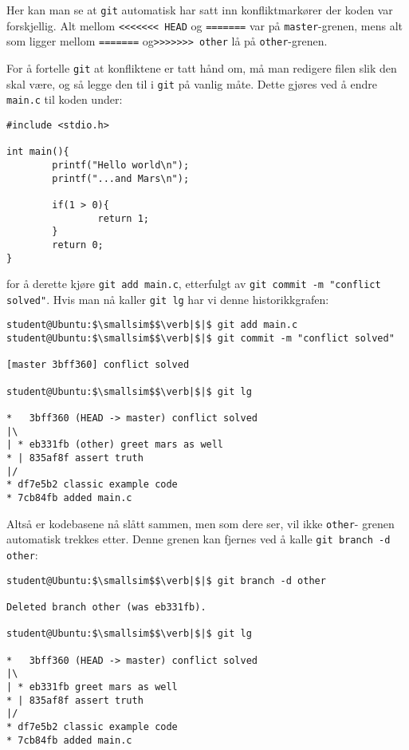 \begin{alphasection}
Her kan man se at \verb|git| automatisk har satt inn konfliktmarkører der koden var forskjellig. Alt mellom \verb|<<<<<<< HEAD| og \verb|=======| var på \verb|master|-grenen, mens alt som ligger mellom \verb|=======| og\verb|>>>>>>> other| lå på \verb|other|-grenen.

For å fortelle \verb|git| at konfliktene er tatt hånd om, må man redigere filen slik den skal være, og så legge den til i \verb|git| på vanlig måte. Dette gjøres ved å endre \verb|main.c| til koden under:

\begin{lstlisting}
#include <stdio.h>

int main(){
        printf("Hello world\n");
        printf("...and Mars\n");
        
        if(1 > 0){
                return 1;
        }
        return 0;
}
\end{lstlisting}

for å derette kjøre \verb|git add main.c|, etterfulgt av \verb|git commit -m "conflict solved"|. Hvis man nå kaller \verb|git lg| har vi denne historikkgrafen:

\begin{lstlisting}[mathescape=true]
student@Ubuntu:$\smallsim$$\verb|$|$ git add main.c
student@Ubuntu:$\smallsim$$\verb|$|$ git commit -m "conflict solved"

[master 3bff360] conflict solved

student@Ubuntu:$\smallsim$$\verb|$|$ git lg

*   3bff360 (HEAD -> master) conflict solved
|\  
| * eb331fb (other) greet mars as well
* | 835af8f assert truth
|/  
* df7e5b2 classic example code
* 7cb84fb added main.c

\end{lstlisting}


Altså er kodebasene nå slått sammen, men som dere ser, vil ikke \verb|other|-
grenen automatisk trekkes etter.  Denne grenen kan fjernes ved å kalle \verb|git branch -d other|:

\clearpage

\begin{lstlisting}[mathescape=true]
student@Ubuntu:$\smallsim$$\verb|$|$ git branch -d other

Deleted branch other (was eb331fb).

student@Ubuntu:$\smallsim$$\verb|$|$ git lg

*   3bff360 (HEAD -> master) conflict solved
|\  
| * eb331fb greet mars as well
* | 835af8f assert truth
|/  
* df7e5b2 classic example code
* 7cb84fb added main.c
\end{lstlisting}


\end{alphasection}
